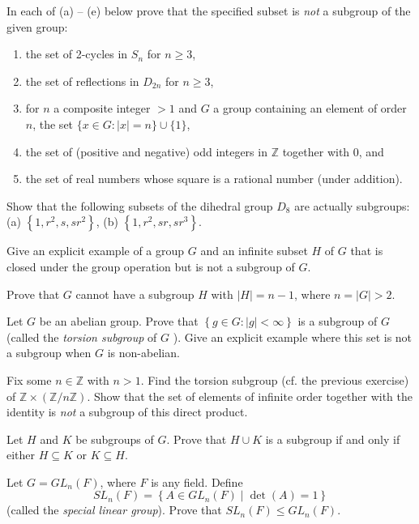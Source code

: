 \documentclass[
    11pt,a4paper,
]{exam}
\begin{document}
\begin{questions}
    
    
    
    
    \question
    In each of (a) -- (e) below prove that the specified subset is \textit{not} a subgroup of the given group:
    \begin{enumerate}[label=(\alph*)]
        \item the set of 2-cycles in \(S_n\) for \(n \geq 3\),
        \item the set of reflections in \(D_{2 n}\) for \(n \geq 3\),
        \item for \(n\) a composite integer \(>1\) and \(G\) a group containing an element of order \(n\), the set \(\{x \in G : | x |=n\} \cup\{1\}\),
        \item the set of (positive and negative) odd integers in \(\mathbb{Z}\) together with 0, and
        \item the set of real numbers whose square is a rational number (under addition).
    \end{enumerate}
    
    \question
    Show that the following subsets of the dihedral group \(D_8\) are actually subgroups:
    (a) \(\left\{1, r^2, s, s r^2\right\}\),
    (b) \(\left\{1, r^2, s r, s r^3\right\}\).
    
    \question
    Give an explicit example of a group \(G\) and an infinite subset \(H\) of \(G\) that is closed under the group operation but is not a subgroup of \(G\).
    
    \question
    Prove that \(G\) cannot have a subgroup \(H\) with \(|H|=n-1\), where \(n=|G|>2\).
    
    
    \question
    Let \(G\) be an abelian group. Prove that \(\left\{g \in G :  |g| <\infty\right\}\) is a subgroup of \(G\) (called the \textit{torsion subgroup} of \(G\) ). Give an explicit example where this set is not a subgroup when \(G\) is non-abelian.
    
    
    \question
    Fix some \(n \in \mathbb{Z}\) with \(n>1\). Find the torsion subgroup (cf. the previous exercise) of \(\mathbb{Z} \times(\mathbb{Z} / n \mathbb{Z})\). Show that the set of elements of infinite order together with the identity is \textit{not} a subgroup of this direct product.
    
    
    \question
    Let \(H\) and \(K\) be subgroups of \(G\). Prove that \(H \cup K\) is a subgroup if and only if either \(H \subseteq K\) or \(K \subseteq H\).
    
    
    \question
    Let \(G=G L_n(F)\), where \(F\) is any field. Define
    \[
    S L_n(F)=\left\{A \in G L_n(F) \mid \operatorname{det}(A)=1\right\}
    \]
    (called the \textit{special linear group}). Prove that \(S L_n(F) \leq G L_n(F)\).
    

\end{questions}
\end{document}
